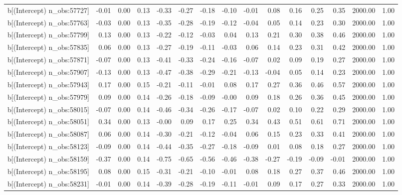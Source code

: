 \begin{table}[ht]
\begin{tabular}{rrrrrrrrrrrrrrr}
  b[(Intercept) n\_obs:57727] & -0.01 & 0.00 & 0.13 & -0.33 & -0.27 & -0.18 & -0.10 & -0.01 & 0.08 & 0.16 & 0.25 & 0.35 & 2000.00 & 1.00 \\ 
  b[(Intercept) n\_obs:57763] & -0.03 & 0.00 & 0.13 & -0.35 & -0.28 & -0.19 & -0.12 & -0.04 & 0.05 & 0.14 & 0.23 & 0.30 & 2000.00 & 1.00 \\ 
  b[(Intercept) n\_obs:57799] & 0.13 & 0.00 & 0.13 & -0.22 & -0.12 & -0.03 & 0.04 & 0.13 & 0.21 & 0.30 & 0.38 & 0.46 & 2000.00 & 1.00 \\ 
  b[(Intercept) n\_obs:57835] & 0.06 & 0.00 & 0.13 & -0.27 & -0.19 & -0.11 & -0.03 & 0.06 & 0.14 & 0.23 & 0.31 & 0.42 & 2000.00 & 1.00 \\ 
  b[(Intercept) n\_obs:57871] & -0.07 & 0.00 & 0.13 & -0.41 & -0.33 & -0.24 & -0.16 & -0.07 & 0.02 & 0.09 & 0.19 & 0.27 & 2000.00 & 1.00 \\ 
  b[(Intercept) n\_obs:57907] & -0.13 & 0.00 & 0.13 & -0.47 & -0.38 & -0.29 & -0.21 & -0.13 & -0.04 & 0.05 & 0.14 & 0.23 & 2000.00 & 1.00 \\ 
  b[(Intercept) n\_obs:57943] & 0.17 & 0.00 & 0.15 & -0.21 & -0.11 & -0.01 & 0.08 & 0.17 & 0.27 & 0.36 & 0.46 & 0.57 & 2000.00 & 1.00 \\ 
  b[(Intercept) n\_obs:57979] & 0.09 & 0.00 & 0.14 & -0.26 & -0.18 & -0.09 & -0.00 & 0.09 & 0.18 & 0.26 & 0.36 & 0.45 & 2000.00 & 1.00 \\ 
  b[(Intercept) n\_obs:58015] & -0.07 & 0.00 & 0.14 & -0.46 & -0.34 & -0.26 & -0.17 & -0.07 & 0.02 & 0.10 & 0.22 & 0.29 & 2000.00 & 1.00 \\ 
  b[(Intercept) n\_obs:58051] & 0.34 & 0.00 & 0.13 & -0.00 & 0.09 & 0.17 & 0.25 & 0.34 & 0.43 & 0.51 & 0.61 & 0.71 & 2000.00 & 1.00 \\ 
  b[(Intercept) n\_obs:58087] & 0.06 & 0.00 & 0.14 & -0.30 & -0.21 & -0.12 & -0.04 & 0.06 & 0.15 & 0.23 & 0.33 & 0.41 & 2000.00 & 1.00 \\ 
  b[(Intercept) n\_obs:58123] & -0.09 & 0.00 & 0.14 & -0.44 & -0.35 & -0.27 & -0.18 & -0.09 & 0.01 & 0.08 & 0.18 & 0.27 & 2000.00 & 1.00 \\ 
  b[(Intercept) n\_obs:58159] & -0.37 & 0.00 & 0.14 & -0.75 & -0.65 & -0.56 & -0.46 & -0.38 & -0.27 & -0.19 & -0.09 & -0.01 & 2000.00 & 1.00 \\ 
  b[(Intercept) n\_obs:58195] & 0.08 & 0.00 & 0.15 & -0.31 & -0.21 & -0.10 & -0.01 & 0.08 & 0.18 & 0.27 & 0.37 & 0.46 & 2000.00 & 1.00 \\ 
  b[(Intercept) n\_obs:58231] & -0.01 & 0.00 & 0.14 & -0.39 & -0.28 & -0.19 & -0.11 & -0.01 & 0.09 & 0.17 & 0.27 & 0.33 & 2000.00 & 1.00 \\ 

\end{tabular}
\end{table}
